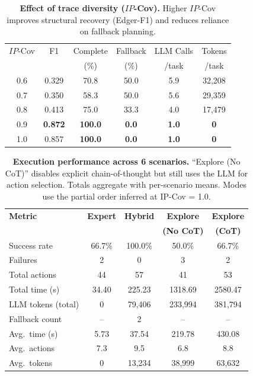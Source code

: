 \documentclass{article}
\theoremstyle{plain}
\theoremstyle{definition}
\theoremstyle{remark}
\begin{document}
\begin{table}[t]
\centering
\caption{\textbf{Effect of trace diversity ($IP$-Cov).}
Higher $IP$-Cov improves structural recovery (Edger-F1) and reduces reliance on fallback planning.}
\label{tab:ipcov_effect}
\small
\setlength{\tabcolsep}{4pt}
\renewcommand{\arraystretch}{1.05}
\begin{tabular}{@{}cccccc@{}}
\toprule
$IP$-Cov & F1 & Complete & Fallback & LLM Calls & Tokens \\
        &    & (\%)     & (\%)     & /task     & /task \\
\midrule
0.6 & 0.329 & 70.8 & 50.0 & 5.9 & 32{,}208 \\
0.7 & 0.350 & 58.3 & 50.0 & 5.6 & 29{,}359 \\
0.8 & 0.413 & 75.0 & 33.3 & 4.0 & 17{,}479 \\
0.9 & \textbf{0.872} & \textbf{100.0} & \textbf{0.0} & \textbf{1.0} & \textbf{0} \\
1.0 & 0.857 & \textbf{100.0} & \textbf{0.0} & \textbf{1.0} & \textbf{0} \\
\bottomrule
\end{tabular}
    \vspace{-10pt} %
\end{table}
\begin{table}[t]
\centering
\caption{\textbf{Execution performance across 6 scenarios.}
“Explore (No CoT)” disables explicit chain-of-thought but still uses the LLM for action selection. Totals aggregate with per-scenario means. Modes use the partial order inferred at IP-Cov = 1.0.}
\label{tab:exec_modes_comparison}
\small
\setlength{\tabcolsep}{3pt}
\renewcommand{\arraystretch}{1.02}
\begin{tabular}{lcccc}
\toprule
\textbf{Metric} &
\textbf{Expert} &
\textbf{Hybrid} &
\textbf{Explore} &
\textbf{Explore} \\
 &  &  & \textbf{(No CoT)} & \textbf{(CoT)} \\
\midrule
Success rate & 66.7\% & 100.0\% & 50.0\% & 66.7\% \\
Failures & 2 & 0 & 3 & 2 \\
Total actions & 44 & 57 & 41 & 53 \\
Total time (s) & 34.40 & 225.23 & 1318.69 & 2580.47 \\

LLM tokens (total) & 0 & 79{,}406 & 233{,}994 & 381{,}794 \\
Fallback count & -- & 2 & -- & -- \\
\midrule
Avg.\ time (s) & 5.73 & 37.54 & 219.78 & 430.08 \\
Avg.\ actions & 7.3 & 9.5 & 6.8 & 8.8 \\
Avg.\ tokens & 0 & 13{,}234 & 38{,}999 & 63{,}632 \\
\bottomrule
\end{tabular}
    \vspace{-10pt} 
\end{table}
\end{document}
